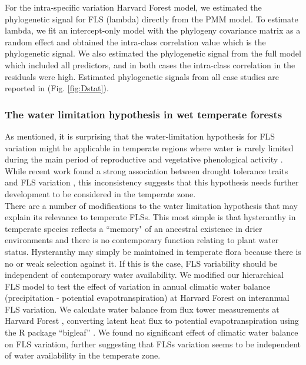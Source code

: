 \documentclass[11pt]{article}
\begin{document}
{  \noindent For the intra-specific variation Harvard Forest model, we estimated the phylogenetic signal for FLS (lambda) directly from the PMM model. To estimate lambda, we fit an intercept-only model with the phylogeny covariance matrix as a random effect and obtained the intra-class correlation value which is the phylogenetic signal. We also estimated the phylogenetic signal from the full model which included all predictors, and in both cases the intra-class correlation in the residuals were high. Estimated phylogenetic signals from all case studies are reported in (Fig. \ref{fig:Dstat}).  
  
  \subsubsection*{The water limitation hypothesis in wet temperate forests}
  \noindent As mentioned, it is surprising that the water-limitation hypothesis for FLS variation might be applicable in temperate regions where water is rarely limited during the main period of reproductive and vegetative phenological activity \citep{Polgar2011}. While recent work found a strong association between drought tolerance traits and FLS variation \citep{Gougherty2018}, this inconsistency suggests that this hypothesis needs further development to be considered in the temperate zone.\\
  
  \noindent There are a number of modifications to the water limitation hypothesis that may explain its relevance to temperate FLSs. This most simple is that hysteranthy in temperate species reflects a ``memory" of an ancestral existence in drier environments and there is no contemporary function relating to plant water status. Hysteranthy may simply be maintained in temperate flora because there is no or weak selection against it. If this is the case, FLS variability should be independent of contemporary water availability. We modified our hierarchical FLS model to test the effect of variation in annual climatic water balance (precipitation - potential evapotranspiration) at Harvard Forest on interannual FLS variation. We calculate water balance from flux tower measurements at Harvard Forest \citep{Hadley2004}, converting latent heat flux to potential evapotranspiration using the R package ``bigleaf'' \citep{Knauer2018}. We found no significant effect of climatic water balance on FLS variation, further suggesting that FLSs variation seems to be independent of water availability in the temperate zone.\\%

}
\end{document}
